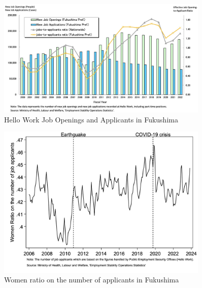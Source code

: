 \documentclass[a4paper,12pt]{article}
\begin{document}

\begin{figure}[h!]
    \centering
    \includegraphics[width=0.9\textwidth]{New Job Openings.jpeg}  %
    \caption{Hello Work Job Openings and Applicants in Fukushima}
    \label{fig:new_job_openings}
\end{figure}




\begin{figure}[h!]
    \centering
    \includegraphics[width=0.9\textwidth]{Women ratio on the number of job applicants.jpg}  %
    \caption{Women ratio on the number of applicants in Fukushima}
    \label{fig:fukushima_Women_ratio_on_applicant}
\end{figure}
\end{document}
